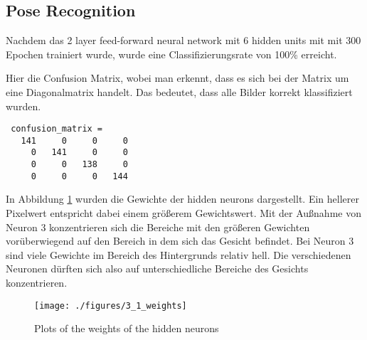 \subsection{Pose Recognition}
Nachdem das 2 layer feed-forward neural network mit 6 hidden units mit mit 300 Epochen trainiert wurde, wurde
eine Classifizierungsrate von 100\% erreicht.

Hier die Confusion Matrix, wobei man erkennt, dass es sich bei der Matrix um eine Diagonalmatrix handelt. Das
bedeutet, dass alle Bilder korrekt klassifiziert wurden.
\begin{verbatim}
 confusion_matrix =
   141     0     0     0
     0   141     0     0
     0     0   138     0
     0     0     0   144
\end{verbatim}

In Abbildung \ref{fig:pose_weights} wurden die Gewichte der hidden neurons dargestellt. Ein hellerer Pixelwert
entspricht dabei einem größerem Gewichtswert.
Mit der Außnahme von Neuron 3 konzentrieren sich die Bereiche mit den größeren Gewichten vorüberwiegend
auf den Bereich in dem sich das Gesicht befindet. Bei Neuron 3 sind viele Gewichte im Bereich des Hintergrunds
relativ hell. Die verschiedenen Neuronen dürften sich also auf unterschiedliche Bereiche des Gesichts konzentrieren.
\begin{figure}[hp!]
\begin{center}
 \texttt{[image: ./figures/3\_1\_weights]}
 \caption{Plots of the weights of the hidden neurons}
\label{fig:pose_weights}
\end{center}
\end{figure}




